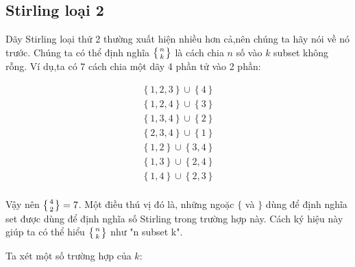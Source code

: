 
\subsection{Stirling loại 2}


Dãy Stirling loại thứ 2 thường xuất hiện nhiều hơn cả,nên chúng ta hãy nói về nó trước. 
Chúng ta có thể định nghĩa 
${\displaystyle \textstyle \left \{ {n \atop k} \right \} }$
là cách chia $n$ số vào $k$ subset không rỗng. 
Ví dụ,ta có 7 cách chia một dãy 4 phần tử vào 2 phần: 


\begin{equation} 
    \begin{aligned}
        \left\{ 1,2,3 \right\} \cup \left\{ 4\right\} \\
        \left\{1,2,4\right\} \cup \left\{ 3\right\} \\
        \left\{ 1,3,4 \right\} \cup \left\{ 2\right\} \\
        \left\{2,3,4 \right\} \cup \left\{1 \right\} \\
        \left\{1,2\right\} \cup \left\{ 3,4\right\} \\
        \left\{ 1,3\right\} \cup \left\{ 2, 4\right\} \\
        \left\{1,4\right\} \cup \left\{2,3\right\} \\ 
    \end{aligned}
\end{equation}

\indent
Vậy nên $\displaystyle \textstyle \left \{ {4 \atop 2} \right \} = 7$.
Một điều thú vị đó là, những ngoặc $\{$ và $\}$ dùng để định nghĩa set 
được dùng để định nghĩa số Stirling trong trường hợp này.
Cách ký hiệu này giúp ta có thể hiểu 
$\left \{ {n \atop k} \right \}$ 
như "n subset k".

\indent
Ta xét một số trường hợp của $k$:


